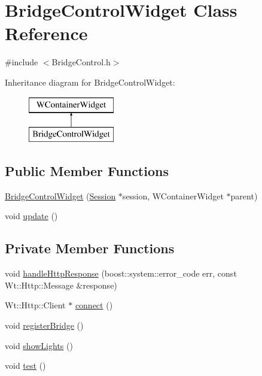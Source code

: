 \hypertarget{class_bridge_control_widget}{}\section{Bridge\+Control\+Widget Class Reference}
\label{class_bridge_control_widget}


{\ttfamily \#include $<$Bridge\+Control.\+h$>$}

Inheritance diagram for Bridge\+Control\+Widget\+:\begin{figure}[H]
\begin{center}
\leavevmode
\includegraphics[height=2.000000cm]{class_bridge_control_widget}
\end{center}
\end{figure}
\subsection*{Public Member Functions}
\begin{DoxyCompactItemize}
\item 
\hyperlink{class_bridge_control_widget_af09e7c2a5993cd307c99ad8c9f964542}{Bridge\+Control\+Widget} (\hyperlink{class_session}{Session} $\ast$session, W\+Container\+Widget $\ast$parent)
\item 
void \hyperlink{class_bridge_control_widget_af8533ce9fe9765ff317d9215fb6aa4da}{update} ()
\end{DoxyCompactItemize}
\subsection*{Private Member Functions}
\begin{DoxyCompactItemize}
\item 
void \hyperlink{class_bridge_control_widget_a894337cd809042fcae667a8caa3f9451}{handle\+Http\+Response} (boost\+::system\+::error\+\_\+code err, const Wt\+::\+Http\+::\+Message \&response)
\item 
Wt\+::\+Http\+::\+Client $\ast$ \hyperlink{class_bridge_control_widget_aaab68c6bb33f44c2edeea7942e190ec6}{connect} ()
\item 
void \hyperlink{class_bridge_control_widget_a23d4fac71d031ec1c4783af139962754}{register\+Bridge} ()
\item 
void \hyperlink{class_bridge_control_widget_ae1204ba0a72cf3a6719fda099532f939}{show\+Lights} ()
\item 
void \hyperlink{class_bridge_control_widget_a5cabafd79c446bbdd5a75a4eee9b316a}{test} ()
\end{DoxyCompactItemize}
